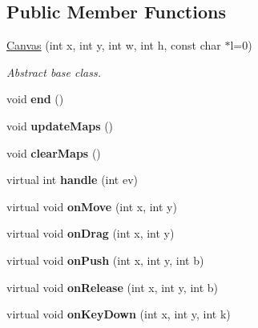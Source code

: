 \subsection*{Public Member Functions}
\begin{DoxyCompactItemize}
\item 
\hypertarget{class_k_graph_1_1_canvas_a6e7e21ab94aed8a2229210bd862f3298}{\hyperlink{class_k_graph_1_1_canvas_a6e7e21ab94aed8a2229210bd862f3298}{Canvas} (int x, int y, int w, int h, const char $\ast$l=0)}\label{class_k_graph_1_1_canvas_a6e7e21ab94aed8a2229210bd862f3298}

\begin{DoxyCompactList}\small\item\em Abstract base class. \end{DoxyCompactList}\item 
\hypertarget{class_k_graph_1_1_canvas_a3454ffa401842bbb52db23ce81e93c93}{void {\bfseries end} ()}\label{class_k_graph_1_1_canvas_a3454ffa401842bbb52db23ce81e93c93}

\item 
\hypertarget{class_k_graph_1_1_canvas_adf47fbb0193ffd33b2ac1cfe69af3265}{void {\bfseries update\-Maps} ()}\label{class_k_graph_1_1_canvas_adf47fbb0193ffd33b2ac1cfe69af3265}

\item 
\hypertarget{class_k_graph_1_1_canvas_a359fd01cf0e9a15cd004174171db1797}{void {\bfseries clear\-Maps} ()}\label{class_k_graph_1_1_canvas_a359fd01cf0e9a15cd004174171db1797}

\item 
\hypertarget{class_k_graph_1_1_canvas_a3723e416805ca1be1fae4eaef0c209aa}{virtual int {\bfseries handle} (int ev)}\label{class_k_graph_1_1_canvas_a3723e416805ca1be1fae4eaef0c209aa}

\item 
\hypertarget{class_k_graph_1_1_canvas_a145097be6a31ee51000bd709acadf225}{virtual void {\bfseries on\-Move} (int x, int y)}\label{class_k_graph_1_1_canvas_a145097be6a31ee51000bd709acadf225}

\item 
\hypertarget{class_k_graph_1_1_canvas_acd9041f3b5119ba11f83ab0359437b39}{virtual void {\bfseries on\-Drag} (int x, int y)}\label{class_k_graph_1_1_canvas_acd9041f3b5119ba11f83ab0359437b39}

\item 
\hypertarget{class_k_graph_1_1_canvas_aff6a255173f26c4de302877acaa6e69b}{virtual void {\bfseries on\-Push} (int x, int y, int b)}\label{class_k_graph_1_1_canvas_aff6a255173f26c4de302877acaa6e69b}

\item 
\hypertarget{class_k_graph_1_1_canvas_a69ac263cd993ab4d70e65d08d60e42c6}{virtual void {\bfseries on\-Release} (int x, int y, int b)}\label{class_k_graph_1_1_canvas_a69ac263cd993ab4d70e65d08d60e42c6}

\item 
\hypertarget{class_k_graph_1_1_canvas_af23da9aa1c998b3902322615775095e0}{virtual void {\bfseries on\-Key\-Down} (int x, int y, int k)}\label{class_k_graph_1_1_canvas_af23da9aa1c998b3902322615775095e0}

\end{DoxyCompactItemize}
